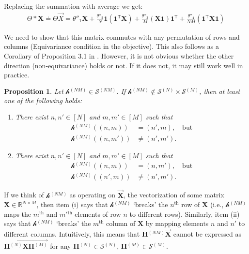 \documentclass{article}
\newcommand{\defeq}{\ensuremath{\doteq}}
\newcommand{\mat}[1]{\ensuremath{\mathbf{#1}}}
\newcommand{\gr}[1]{\ensuremath{\mathcal{#1}}}
\newcommand{\set}[1]{\ensuremath{\mathbb{#1}}}
\renewcommand{\vec}[1]{\ensuremath{\overrightarrow{#1}}}
\newcommand{\prm}[1]{\ensuremath{^{(#1)}}}
\newcommand{\grn}[2]{\ensuremath{\gr{#1}\prm{#2}}}
\newcommand{\Trp}[0]{\ensuremath{^{\mathsf{T}}}}
\newcommand{\XX}[0]{\ensuremath{\mat{X}}}
\renewcommand{\Re}[0]{\ensuremath{\set{R}}}
\newtheorem{proposition}[theorem]{Proposition}
\theoremstyle{definition}
\begin{document}
Replacing the summation with average we get:
\begin{align}\label{eq:param_avg}
  \Theta * \XX \defeq \Theta \vec{X} = \theta''_1 \XX + \frac{\theta''_2}{N} \mat{1} (\mat{1}\Trp \XX) + \frac{\theta''_3}{M} (\XX \mat{1})\mat{1}\Trp + \frac{\theta''_4}{N M} (\mat{1}\Trp \XX \mat{1})
\end{align}

We need to show that this matrix commutes with any permutation of rows and columns (Equivariance condition in the objective). This also follows as a Corollary of Proposition 3.1 in \citep{ravanbakhsh_symmetry}. However, it is not obvious whether the other direction (non-equivariance) holds or not. If it does not, it may still work well in practice.

\begin{proposition}\label{prop:H1}
  Let $\grn{h}{NM} \in \grn{S}{NM}$. If $\grn{h}{NM} \not\in \grn{S}{N} \times \grn{S}{M}$, then at least one of the following holds:
  \begin{enumerate}
    \item[(i)]
      There exist $n, n' \in [N]$ and $m, m' \in [M]$ such that 
      \begin{align*}
        \grn{h}{NM}((n, m)) &= (n', m), \quad \text{but} \\
        \grn{h}{NM}((n, m')) &\neq (n', m'). 
      \end{align*}
    \item[(ii)]
      There exist $n, n' \in [N]$ and $m, m' \in [M]$ such that 
      \begin{align*}
        \grn{h}{NM}((n, m)) &= (n, m'), \quad \text{but} \\
        \grn{h}{NM}((n', m)) &\neq (n', m'). 
      \end{align*}
  \end{enumerate}
\end{proposition}
If we think of $\grn{h}{NM}$ as operating on $\vec{\XX}$, the vectorization of some matrix $\XX \in \Re^{N \times M}$, then item (i) says that $\grn{h}{NM}$ `breaks' the $n^\text{th}$ row of $\XX$ (i.e., $\grn{h}{NM}$ maps the $m^\text{th}$ and $m'$$^\text{th}$ elements of row $n$ to different rows). Similarly, item (ii) says that $\grn{h}{NM}$ `breaks' the $m^\text{th}$ column of $\XX$ by mapping elements $n$ and $n'$ to different columns. Intuitively, this means that $\mat{H}\prm{NM} \vec{\XX}$ cannot be expressed as $\vec{\mat{H}\prm{N} \XX \mat{H}\prm{M}}$ for any $\mat{H}\prm{N} \in \grn{S}{N}$, $\mat{H}\prm{M} \in \grn{S}{M}$.
\end{document}
